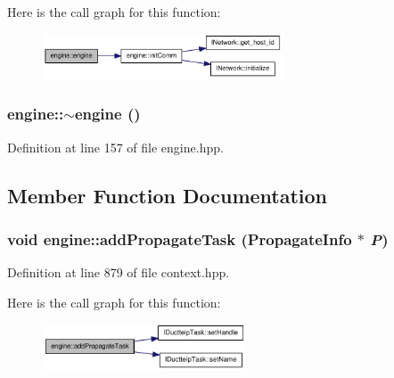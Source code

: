 Here is the call graph for this function:\nopagebreak
\begin{figure}[H]
\begin{center}
\leavevmode
\includegraphics[width=202pt]{classengine_aaffbfa4e20b4b627f2336eb6b40db348_cgraph}
\end{center}
\end{figure}
\hypertarget{classengine_aa3557f06618b07672ae2350091d42577}{
\subsubsection[{$\sim$engine}]{\setlength{\rightskip}{0pt plus 5cm}engine::$\sim$engine ()}}
\label{classengine_aa3557f06618b07672ae2350091d42577}


Definition at line 157 of file engine.hpp.

\subsection{Member Function Documentation}
\hypertarget{classengine_a9d0024f21ae5fa522fefdd38eade0a2e}{
\subsubsection[{addPropagateTask}]{\setlength{\rightskip}{0pt plus 5cm}void engine::addPropagateTask ({\bf PropagateInfo} $\ast$ {\em P})}}
\label{classengine_a9d0024f21ae5fa522fefdd38eade0a2e}


Definition at line 879 of file context.hpp.

Here is the call graph for this function:\nopagebreak
\begin{figure}[H]
\begin{center}
\leavevmode
\includegraphics[width=171pt]{classengine_a9d0024f21ae5fa522fefdd38eade0a2e_cgraph}
\end{center}
\end{figure}


